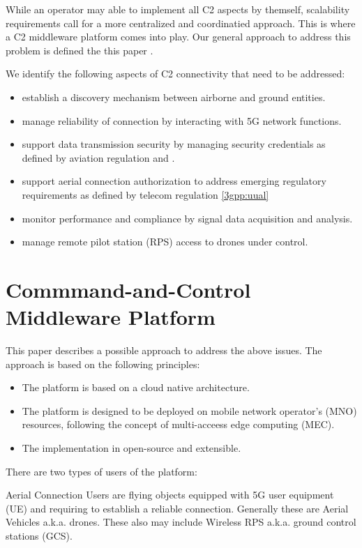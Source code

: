 \documentclass[a4paper,conference]{IEEEtran}
\begin{document}
While an operator may able to implement all C2 aspects by themself, scalability requirements call for a more centralized and coordinatied approach. This is where a C2 middleware platform comes into play. Our general approach to address this problem is defined the this paper \cite{uai}.

We identify the following aspects of C2 connectivity that need to be addressed:

\begin{itemize}
\item establish a discovery mechanism between airborne and ground entities.
\item manage reliability of connection by interacting with 5G network functions.
\item support data transmission security by managing security credentials as defined by aviation regulation \cite{icao:annex10VI} and \cite{rtca:do377a}.
\item support aerial connection authorization to address emerging regulatory requirements as defined by telecom regulation \ref{3gpp:uual}
\item monitor performance and compliance by signal data acquisition and analysis.
\item manage remote pilot station (RPS) access to drones under control.
\end{itemize}


\section{Commmand-and-Control Middleware Platform}

This paper describes a possible approach to address the above issues. The approach is based on the following principles:

\begin{itemize}
\item The platform is based on a cloud native architecture.
\item The platform is designed to be deployed on mobile network operator's (MNO) resources, following the concept of multi-acceess edge computing (MEC).
\item The implementation in open-source and extensible.
\end{itemize}

There are two types of users of the platform:

Aerial Connection Users are flying objects equipped with 5G user equipment (UE) and requiring to establish a reliable connection. Generally these are Aerial Vehicles a.k.a. drones. These also may include Wireless RPS a.k.a. ground control stations (GCS).
\end{document}
